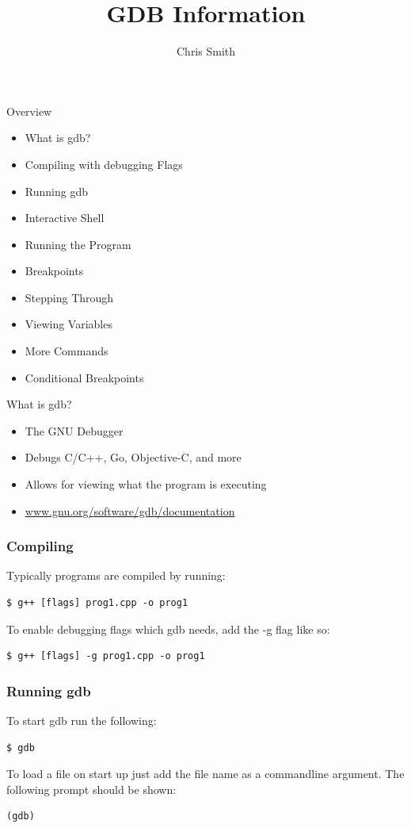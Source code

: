 \documentclass[11pt]{beamer}
\author{Chris Smith}
\title{GDB Information}
\institute{SDSMT ACM/LUG}
\begin{document}
\begin{frame}
\titlepage
\end{frame}

\begin{frame}{Overview}
\begin{itemize}
\item What is gdb?
\item Compiling with debugging Flags
\item Running gdb
\item Interactive Shell
\item Running the Program
\item Breakpoints
\item Stepping Through
\item Viewing Variables
\item More Commands
\item Conditional Breakpoints
\end{itemize}
\end{frame}


\begin{frame}{What is gdb?}
\begin{itemize}
\item The GNU Debugger
\item Debugs C/C++, Go, Objective-C, and more
\item Allows for viewing what the program is executing
\item \href{https://www.gnu.org/software/gdb/documentation/}{www.gnu.org/software/gdb/documentation}
\end{itemize}
\end{frame}

\begin{frame}[fragile]
\frametitle{Compiling}
Typically programs are compiled by running:
\begin{lstlisting}[style=BashInputStyle]
 $ g++ [flags] prog1.cpp -o prog1
\end{lstlisting}
To enable debugging flags which gdb needs, add the -g flag like so:
\begin{lstlisting}[style=BashInputStyle]
 $ g++ [flags] -g prog1.cpp -o prog1
\end{lstlisting}
\end{frame}

\begin{frame}[fragile]
\frametitle{Running gdb}
To start gdb run the following:
\begin{lstlisting}[style=BashInputStyle]
 $ gdb
\end{lstlisting}
 To load a file on start up just add the file name as a commandline argument. 
 \break
 \break
 The following prompt should be shown:
\begin{lstlisting}[style=BashInputStyle]
 (gdb)
\end{lstlisting}
\end{frame}
\end{document}

